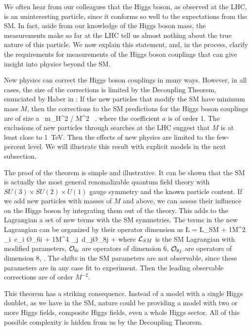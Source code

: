 We often hear from our colleagues that the Higgs boson, as observed at the LHC, is an uninteresting particle, since it conforms so well to the expectations from the SM.   In fact, aside from our knowledge of the Higgs boson mass, the measurements make so far at the LHC tell us almost nothing about the true nature of this particle.   We now 
explain this statement, and, in the process, clarify the requirements for measurements of the Higgs boson couplings that can give insight into physics beyond the SM. 

New physics can correct the Higgs boson couplings in many ways.  However, in all cases, the size of the corrections is limited by the Decoupling Theorem, enunciated by Haber in \cite{Haber:1994mt}:    If the new particles that modify the SM have minimum mass $M$, then  the corrections to the SM predictions for the Higgs boson couplings are of size 
\beq 
              a \,     m_H^2 / M^2   \  .
\eeqn
where the coefficient $a$ is of order 1.   The exclusions of new particles through searches at the LHC suggest that $M$ is at least close to 1~TeV.   Then the effects of  new physics are limited to the few-percent level.   We will illustrate this result with explicit models in the next subsection.

The proof of the theorem is simple and illustrative.   It can be shown that the SM is actually the most general renomalizable quantum field theory with $SU(3)\times SU(2)\times U(1)$ gauge symmetry and the known particle content.   If we add new particles with masses of $M$ and above, we can assess their influence on the Higgs boson by integrating them out of the theory.  This adds to the Lagrangian a set of new terms with the SM symmetries.   The terms in the new Lagrangian  can be organized by their operator dimension 
as 
\beq 
   {\L}  =  {\L}_{SM} + {1\over M^2} \sum_i\,  c_i \O_{6i} + {1\over M^4 } \sum_j\,  d_j\O_{8j} + \cdots
{}
where ${\cal L}_{SM}$ is the SM Lagrangian with modified parameters, ${\cal O}_{6i}$  are operators of dimension 6, ${\cal O}_{8j}$ are operators of dimension 8, \etc.   The shifts in the SM parameters are not observable, since these parameters are in any case fit to experiment.  Then the leading observable corrections are of order $M^{-2}$. 

This theorem has a striking consequence.  Instead of a model with a single Higgs doublet, as we have in the SM, nature could be providing  a model with two or more Higgs fields, composite Higgs fields, even a whole Higgs sector.  All of this possible complexity is hidden from us by the Decoupling Theorem. 

